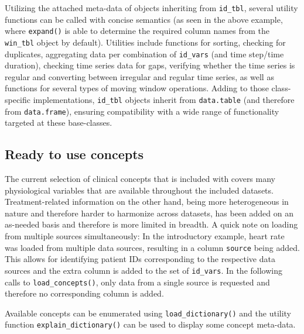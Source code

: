 \documentclass[
  notitle]{jss}
\begin{document}
Utilizing the attached meta-data of objects inheriting from
\texttt{id\_tbl}, several utility functions can be called with concise
semantics (as seen in the above example, where \texttt{expand()} is able
to determine the required column names from the \texttt{win\_tbl} object
by default). Utilities include functions for sorting, checking for
duplicates, aggregating data per combination of \texttt{id\_vars} (and
time step/time duration), checking time series data for gaps, verifying
whether the time series is regular and converting between irregular and
regular time series, as well as functions for several types of moving
window operations. Adding to those class-specific implementations,
\texttt{id\_tbl} objects inherit from \texttt{data.table} (and therefore
from \texttt{data.frame}), ensuring compatibility with a wide range of
functionality targeted at these base-classes.

\hypertarget{ready-to-use-concepts}{%
\subsection{Ready to use concepts}\label{ready-to-use-concepts}}

The current selection of clinical concepts that is included with
 covers many physiological variables that are available
throughout the included datasets. Treatment-related information on the
other hand, being more heterogeneous in nature and therefore harder to
harmonize across datasets, has been added on an as-needed basis and
therefore is more limited in breadth. A quick note on loading from
multiple sources simultaneously: In the introductory example, heart rate
was loaded from multiple data sources, resulting in a column
\texttt{source} being added. This allows for identifying patient IDs
corresponding to the respective data sources and the extra column is
added to the set of \texttt{id\_vars}. In the following calls to
\texttt{load\_concepts()}, only data from a single source is requested
and therefore no corresponding column is added.

Available concepts can be enumerated using \texttt{load\_dictionary()}
and the utility function \texttt{explain\_dictionary()} can be used to
display some concept meta-data.
\end{document}
